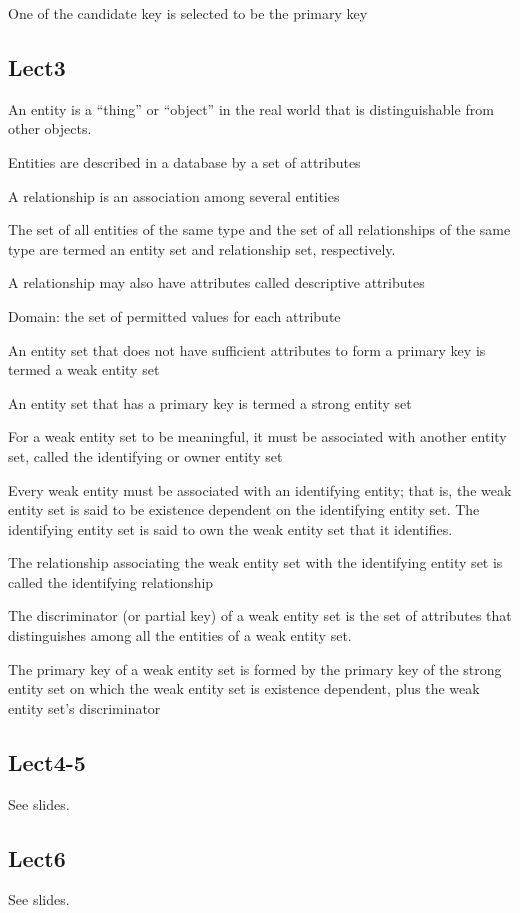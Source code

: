\documentclass[8pt, a4paper, oneside, twocolumn]{extarticle}
\begin{document}
One of the candidate key is selected to be the primary key
\subsection{Lect3}
An entity is a “thing” or “object” in the real world that is 
distinguishable from other objects. 

Entities are described in a database by a set of attributes

A relationship is an association among several entities

The set of all entities of the same type and the set of all relationships of the same type are termed an entity set and relationship set, respectively. 

A relationship may also have attributes called descriptive attributes

Domain: the set of permitted values for each attribute 

An entity set that does not have sufficient attributes to form a primary key is termed a weak entity set

An entity set that has a primary key is termed a strong entity set

For a weak entity set to be meaningful, it must be associated with another entity set, called the identifying or owner entity set

Every weak entity must be associated with an identifying entity; that is, the weak entity set is said to be existence dependent on the  identifying entity set. The identifying entity set is said to  own the  weak entity set that it identifies. 

The relationship associating the weak entity set with the identifying  entity set is called the identifying relationship

The discriminator (or partial key) of a weak entity set is the set of attributes that distinguishes among all the entities of a weak entity set.

The primary key of a weak entity set is formed by the primary key of the strong entity set on which the weak entity set is existence dependent, plus the weak entity set’s discriminator
\subsection{Lect4-5}
See slides.
\subsection{Lect6}
See slides.
\end{document}
